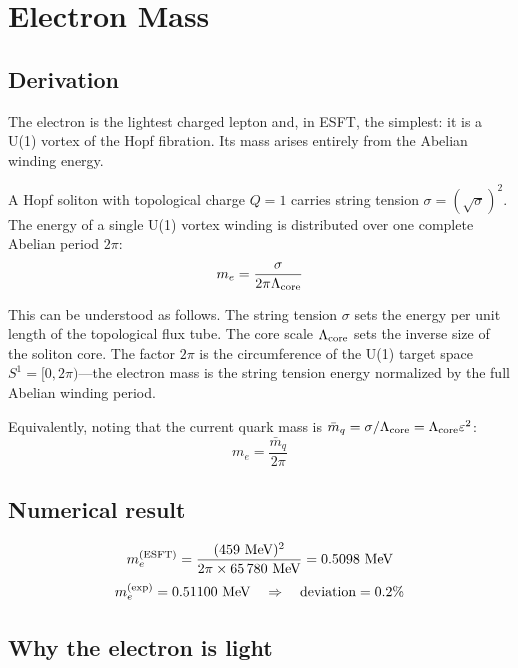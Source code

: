 ﻿\documentclass[twocolumn,preprintnumbers,amsmath,amssymb]{revtex4-2}
\begin{document}
\section{Electron Mass}
\label{sec:electron}

\subsection{Derivation}

The electron is the lightest charged lepton and, in ESFT, the simplest: it is a U(1) vortex of the Hopf fibration. Its mass arises entirely from the Abelian winding energy.

A Hopf soliton with topological charge $Q = 1$ carries string tension $\sigma = (\sqrt{\sigma})^2$. The energy of a single U(1) vortex winding is distributed over one complete Abelian period $2\pi$:
\begin{equation}
m_e = \frac{\sigma}{2\pi\Lambda_{\rm core}}
\label{eq:me}
\end{equation}

This can be understood as follows. The string tension $\sigma$ sets the energy per unit length of the topological flux tube. The core scale $\Lambda_{\rm core}$ sets the inverse size of the soliton core. The factor $2\pi$ is the circumference of the U(1) target space $S^1 = [0, 2\pi)$---the electron mass is the string tension energy normalized by the full Abelian winding period.

Equivalently, noting that the current quark mass is $\bar{m}_q = \sigma/\Lambda_{\rm core} = \Lambda_{\rm core}\varepsilon^2$:
\begin{equation}
m_e = \frac{\bar{m}_q}{2\pi}
\label{eq:me_alt}
\end{equation}

\subsection{Numerical result}

\begin{equation}
m_e^{(\rm ESFT)} = \frac{(459~\text{MeV})^2}{2\pi \times 65\,780~\text{MeV}} = 0.5098~\text{MeV}
\end{equation}
\begin{equation}
m_e^{(\rm exp)} = 0.51100~\text{MeV} \quad \Rightarrow \quad \text{deviation} = 0.2\%
\end{equation}

\subsection{Why the electron is light}
\end{document}

